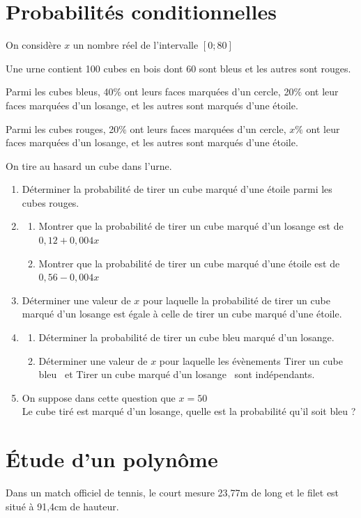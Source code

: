 \documentclass[oneside,12pt]{article}
\begin{document}
\section{Probabilités conditionnelles}
On considère $x$ un nombre réel de l'intervalle $[0;80]$ 

Une urne contient 100 cubes en bois dont 60 sont bleus et les autres sont rouges. 

Parmi les cubes bleus, 40$\%$ ont leurs faces marquées d'un cercle, 20$\%$ ont leur faces marquées d'un losange, et les autres sont marqués d'une étoile. 

Parmi les cubes rouges, 20$\%$ ont leurs faces marquées d'un cercle, $x\%$ ont leur faces marquées d'un losange, et les autres sont marqués d'une étoile.

On tire au hasard un cube dans l'urne.
\begin{enumerate}
	\item Déterminer la probabilité de tirer un cube marqué d'une étoile parmi les cubes rouges.
    \item \begin{enumerate}
    	\item Montrer que la probabilité de tirer un cube marqué d'un losange est de $0,12 + 0,004x$
    	\item Montrer que la probabilité de tirer un cube marqué d'une étoile est de $0,56 - 0,004x$
\end{enumerate}    
    \item Déterminer une valeur de $x$ pour laquelle la probabilité de tirer un cube marqué d'un losange est égale à celle de tirer un cube marqué d'une étoile.
    \item \begin{enumerate}
    	\item Déterminer la probabilité de tirer un cube bleu marqué d'un losange.
    	\item Déterminer une valeur de $x$ pour laquelle les évènements \og Tirer un cube bleu \fg ~et \og Tirer un cube marqué d'un losange\fg~ sont indépendants.
    	\end{enumerate}
    \item On suppose dans cette question que $x=50$ \\
    Le cube tiré est marqué d'un losange, quelle est la probabilité qu'il soit bleu ?
	
\end{enumerate}




\section{Étude d'un polynôme}
Dans un match officiel de tennis, le court mesure 23,77m de long et le filet est situé à 91,4cm de hauteur.
\end{document}
